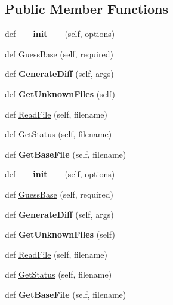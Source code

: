 \subsection*{Public Member Functions}
\begin{DoxyCompactItemize}
\item 
\mbox{\label{classupload_1_1SubversionVCS_a8333f94e27335ce83eed0cc3f5a1eeb0}} 
def {\bfseries \+\_\+\+\_\+init\+\_\+\+\_\+} (self, options)
\item 
def \mbox{\hyperlink{classupload_1_1SubversionVCS_a7d22d459469a757270502ce0dccacbd2}{Guess\+Base}} (self, required)
\item 
\mbox{\label{classupload_1_1SubversionVCS_a07c2d341f2c7df2772dd7f85e89b0212}} 
def {\bfseries Generate\+Diff} (self, args)
\item 
\mbox{\label{classupload_1_1SubversionVCS_a494ba1010992d83cac015bc396ab693a}} 
def {\bfseries Get\+Unknown\+Files} (self)
\item 
def \mbox{\hyperlink{classupload_1_1SubversionVCS_a340d269b74386ac863636f6b0683d9f4}{Read\+File}} (self, filename)
\item 
def \mbox{\hyperlink{classupload_1_1SubversionVCS_ac3785eb1fa561088206d01570f9fe982}{Get\+Status}} (self, filename)
\item 
\mbox{\label{classupload_1_1SubversionVCS_a29dec4941de0824734d6842a2f33ffc3}} 
def {\bfseries Get\+Base\+File} (self, filename)
\item 
\mbox{\label{classupload_1_1SubversionVCS_a8333f94e27335ce83eed0cc3f5a1eeb0}} 
def {\bfseries \+\_\+\+\_\+init\+\_\+\+\_\+} (self, options)
\item 
def \mbox{\hyperlink{classupload_1_1SubversionVCS_a7d22d459469a757270502ce0dccacbd2}{Guess\+Base}} (self, required)
\item 
\mbox{\label{classupload_1_1SubversionVCS_a07c2d341f2c7df2772dd7f85e89b0212}} 
def {\bfseries Generate\+Diff} (self, args)
\item 
\mbox{\label{classupload_1_1SubversionVCS_a494ba1010992d83cac015bc396ab693a}} 
def {\bfseries Get\+Unknown\+Files} (self)
\item 
def \mbox{\hyperlink{classupload_1_1SubversionVCS_a340d269b74386ac863636f6b0683d9f4}{Read\+File}} (self, filename)
\item 
def \mbox{\hyperlink{classupload_1_1SubversionVCS_ac3785eb1fa561088206d01570f9fe982}{Get\+Status}} (self, filename)
\item 
\mbox{\label{classupload_1_1SubversionVCS_a29dec4941de0824734d6842a2f33ffc3}} 
def {\bfseries Get\+Base\+File} (self, filename)
\end{DoxyCompactItemize}
